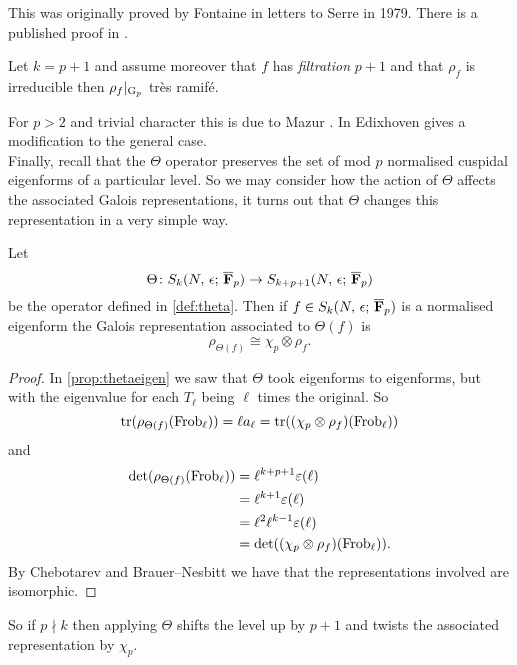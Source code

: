 \documentclass[a4paper,12pt]{article}
\begin{document}
This was originally proved by Fontaine in letters to Serre in 1979.
There is a published proof in \cite[sec. 6]{EdixhovenWeight}.

\begin{thm}[Mazur]\label{thm:mazur}
Let $k = p + 1$ and assume moreover that $f$ has \emph{filtration} $p+1$ and that $\rho_{f}$ is irreducible then $\rho_{f}|_{\mathrm{G}_p}$ tr\`es ramif\'e.
\end{thm}

For $p> 2$ and trivial character this is due to Mazur \cite[sec. 6]{Ribet90}.
In \cite[sec. 2]{EdixhovenWeight} Edixhoven gives a modification to the general case.
\\[12pt] \noindent
Finally, recall that the $\Theta$ operator preserves the set of mod $p$ normalised cuspidal eigenforms of a particular level.
So we may consider how the action of $\Theta$ affects the associated Galois representations, it turns out that $\Theta$ changes this representation in a very simple way.

\begin{prop}\label{prop:theta}
Let
\[
\Theta\colon S_k(N,\,\epsilon;\,\overline{\mathbf{F}}_p)\to S_{k+p+1}(N,\,\epsilon;\,\overline{\mathbf{F}}_p)
\]
be the operator defined in \cref{def:theta}.
Then if $f \in S_k(N,\,\epsilon;\,\overline{\mathbf{F}}_p)$ is a normalised eigenform the Galois representation associated to $\Theta(f)$ is
\[
\rho_{\Theta(f)} \cong \chi_p\otimes\rho_{f}.
\]
\end{prop}
\begin{proof}
In \cref{prop:thetaeigen} we saw that $\Theta$ took eigenforms to eigenforms, but with the eigenvalue for each $T_{\ell}$ being $\ell$ times the original.
So
\[
\operatorname{tr}(\rho_{\Theta(f)}(\operatorname{Frob}_\ell)) = \ell a_{\ell} = \operatorname{tr}((\chi_p \otimes \rho_{f})(\operatorname{Frob}_{\ell}))
\]
and
\begin{align*}
\det(\rho_{\Theta(f)}(\operatorname{Frob}_\ell)) &= \ell^{k+p+1}\varepsilon(\ell)\\
                                   &= \ell^{k+1}\varepsilon(\ell)\\
                                   &= \ell^2\ell^{k-1}\varepsilon(\ell)\\
                                   &= \det((\chi_p \otimes \rho_{f})(\operatorname{Frob}_{\ell})).
\end{align*}
By Chebotarev and Brauer--Nesbitt we have that the representations involved are isomorphic.
\end{proof}

So if $p\nmid k$ then applying $\Theta$ shifts the level up by $p+1$ and twists the associated representation by $\chi_p$.
\end{document}
